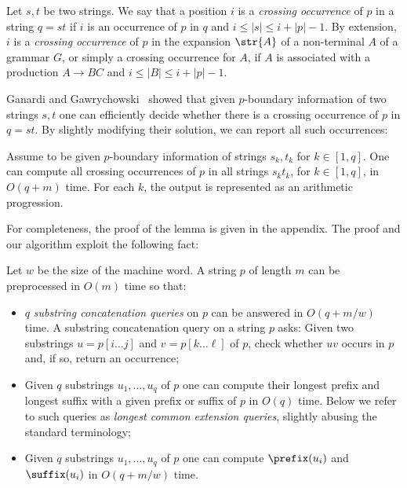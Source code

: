 \begin{definition}
Let $s,t$ be two strings. We say that a position $i$ is a \emph{crossing occurrence} of $p$ in a string $q=st$ if $i$ is an occurrence of $p$ in $q$ and $i \le |s| \le i+|p|-1$. By extension, $i$ is a \emph{crossing occurrence} of $p$ in the expansion $\str{A}$ of a non-terminal $A$ of a grammar $G$, or simply a crossing occurrence for $A$, if $A$ is associated with a production $A\rightarrow BC$ and $i \le |B| \le i+|p|-1$.
\end{definition}

Ganardi and Gawrychowski~\cite{DBLP:conf/soda/GanardiG22} showed that given $p$-boundary information of two strings $s,t$ one can efficiently decide whether there is a crossing occurrence of $p$ in $q = st$. By slightly modifying their solution, we can report all such occurrences: 

\begin{lemma}
\label{lemma:crossing}
Assume to be given $p$-boundary information of strings $s_k, t_k$ for $k \in [1,q]$. One can compute all crossing occurrences of $p$ in all strings $s_k t_k$, for $k\in[1,q]$, in $O(q+m)$ time. For each $k$, the output is represented as an arithmetic progression.
\end{lemma}

For completeness, the proof of the lemma is given in the appendix. The proof and our algorithm exploit the following fact:

\begin{fact}
\label{fact:substring_concat}
Let $w$ be the size of the machine word. A string $p$ of length $m$ can be preprocessed in $O(m)$ time so that:
\begin{itemize}
\item $q$ \emph{substring concatenation queries} on $p$ can be answered in $O(q+m/w)$ time. A substring concatenation query on a string $p$ asks: Given two substrings $u = p[i\dots j]$ and $v = p[k \dots \ell]$ of $p$, check whether $uv$ occurs in $p$ and, if so, return an occurrence; 
\item Given $q$ substrings $u_1,\ldots,u_q$ of $p$ one can compute their longest prefix and longest suffix with a given prefix or suffix of $p$ in $O(q)$ time. Below we refer to such queries as \emph{longest common extension queries}, slightly abusing the standard terminology;
\item Given $q$ substrings $u_1,\ldots,u_q$ of $p$ one can compute $\prefix(u_i)$ and $\suffix(u_i)$ in $O(q+m/w)$ time.
\end{itemize}
\end{fact} 